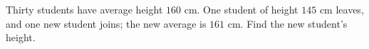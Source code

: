 Thirty students have average height $160$ cm. One student of height $145$ cm leaves, and one new student joins; the new average is $161$ cm. Find the new student's height.
